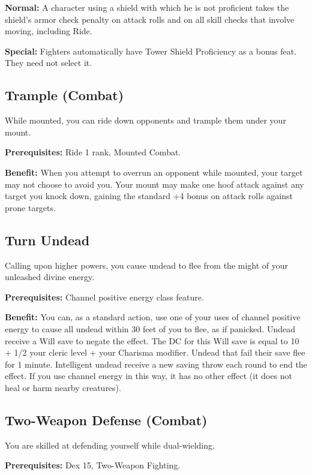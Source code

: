 \textbf{Normal:} A character using a shield with which he is not proficient takes the shield's armor check penalty on attack rolls and on all skill checks that involve moving, including Ride.
				
\textbf{Special:} Fighters automatically have Tower Shield Proficiency as a bonus feat. They need not select it.
				
\subsection{Trample (Combat)}

				
While mounted, you can ride down opponents and trample them under your mount.
				
\textbf{Prerequisites:} Ride 1 rank, Mounted Combat.
				
\textbf{Benefit:} When you attempt to overrun an opponent while mounted, your target may not choose to avoid you. Your mount may make one hoof attack against any target you knock down, gaining the standard +4 bonus on attack rolls against prone targets.
				
\subsection{Turn Undead}

				
Calling upon higher powers, you cause undead to flee from the might of your unleashed divine energy.
				
\textbf{Prerequisites:} Channel positive energy class feature.
				
\textbf{Benefit:} You can, as a standard action, use one of your uses of channel positive energy to cause all undead within 30 feet of you to flee, as if panicked. Undead receive a Will save to negate the effect. The DC for this Will save is equal to 10 + 1/2 your cleric level + your Charisma modifier. Undead that fail their save flee for 1 minute. Intelligent undead receive a new saving throw each round to end the effect. If you use channel energy in this way, it has no other effect (it does not heal or harm nearby creatures).
				
\subsection{Two-Weapon Defense (Combat)}

				
You are skilled at defending yourself while dual-wielding.
				
\textbf{Prerequisites:} Dex 15, Two-Weapon Fighting.
				
